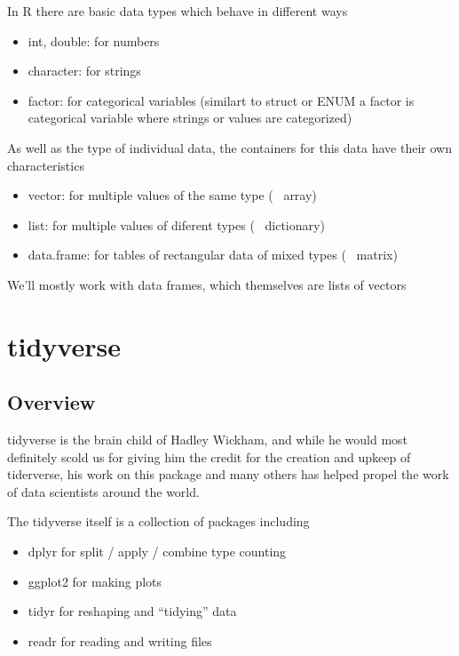 \documentclass{article}
\begin{document}
\begin{flushleft}
In R there are basic data types which behave in different ways

\begin{itemize}
    \item int, double: for numbers
    \item character: for strings
    \item factor: for categorical variables (similart to struct or ENUM a factor is categorical variable where strings or values are categorized) 
\end{itemize}

As well as the type of individual data, the containers for this data have their own characteristics 

\begin{itemize}
    \item vector: for multiple values of the same type (~ array)
    \item list: for multiple values of diferent types (~ dictionary)
    \item data.frame: for tables of rectangular data of mixed types (~ matrix)
\end{itemize}

We'll mostly work with data frames, which themselves are lists of vectors

\end{flushleft}


\section{tidyverse}
\subsection{Overview}

\begin{flushleft}
tidyverse is the brain child of Hadley Wickham, and while he would most definitely scold us for giving him the credit for the creation and upkeep of tiderverse, his work on this package and many others has helped propel the work of data scientists around the world.
\end{flushleft}

\begin{flushleft}
The tidyverse itself is a collection of packages including
\begin{itemize}
    \item dplyr for split / apply / combine type counting
    \item ggplot2 for making plots
    \item tidyr for reshaping and “tidying” data
    \item readr for reading and writing files
\end{itemize}

\end{flushleft}
\end{document}
